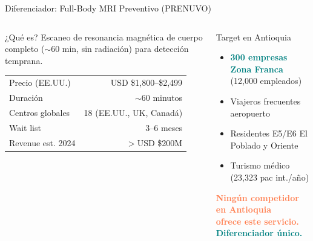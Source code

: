 \documentclass[aspectratio=169, 11pt]{beamer}
\newcommand{\highlight}[1]{\textcolor{teal}{\textbf{#1}}}
\newcommand{\danger}[1]{\textcolor{coral}{\textbf{#1}}}
\newcommand{\src}[1]{\par\vspace{2pt}{\tiny\textcolor{slate}{Fuente: #1}}}
\begin{document}
\begin{frame}{Diferenciador: Full-Body MRI Preventivo (PRENUVO)}

\begin{columns}[T]
\begin{block}{\small ¿Qué es?}
\footnotesize
Escaneo de resonancia magnética de cuerpo completo ($\sim$60 min, sin radiación) para detección temprana.

\vspace{4pt}
\begin{tabular}{@{}lr@{}}
\toprule
Precio (EE.UU.) & USD \$1,800--\$2,499 \\
Duración & $\sim$60 minutos \\
Centros globales & 18 (EE.UU., UK, Canadá) \\
Wait list & 3--6 meses \\
Revenue est. 2024 & $>$USD \$200M \\
\bottomrule
\end{tabular}
\end{block}

\begin{exampleblock}{\small Target en Antioquia}
\footnotesize
\begin{itemize}\setlength{\itemsep}{2pt}
  \item \highlight{300 empresas Zona Franca} (12,000 empleados)
  \item Viajeros frecuentes aeropuerto
  \item Residentes E5/E6 El Poblado y Oriente
  \item Turismo médico (23,323 pac int./año)
\end{itemize}

\vspace{6pt}
\centering
\danger{Ningún competidor en Antioquia\\ofrece este servicio.}\\[4pt]
\highlight{Diferenciador único.}
\end{exampleblock}
\end{columns}

\src{PRENUVO.com, Forbes, Bloomberg 2024}
\end{frame}
\end{document}
